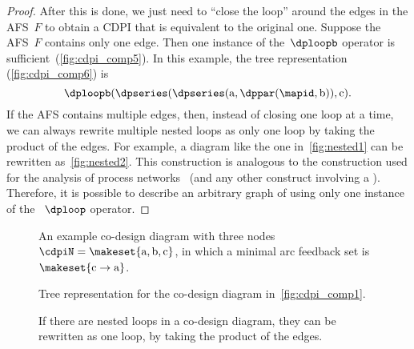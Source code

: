\begin{proof}
    After this is done, we just need to ``close the loop'' around the edges in the AFS~$F$ to obtain a CDPI that is equivalent to the original one.
    Suppose the AFS~$F$ contains only one edge.
    Then one instance of the~$\dploopb$ operator is sufficient~(\cref{fig:cdpi_comp5}).
    In this example, the tree representation (\cref{fig:cdpi_comp6}) is
    \begin{equation}
        \dploopb(\dpseries(\dpseries(\text{a},\dppar(\mapid,\text{b})),\text{c}).
    \end{equation}
    If the AFS contains multiple edges, then, instead of closing one loop at a time, we can always rewrite multiple nested loops as only one loop by taking the product of the edges.
    For example, a diagram like the one in~\cref{fig:nested1} can be rewritten as~\cref{fig:nested2}.
    This construction is analogous to the construction used for the analysis of process networks~\cite{lee10} (and any other construct involving a ).
    Therefore, it is possible to describe an arbitrary graph of  using only one instance of the ~$\dploop$ operator.
\end{proof}

\begin{figure}[tbh]
    \hfill{}
    \hfill{}

    \caption{An example co-design diagram with three nodes~$\cdpiN=\makeset{\text{a},\text{b},\text{c}}$,
        in which a minimal arc feedback set is $\makeset{\text{c}\rightarrow\text{a}}$.
    }
\end{figure}

\begin{figure}
    \hfill{}
    \hfill{}
    \hfill{}

    \caption{Tree representation for the co-design diagram in~\cref{fig:cdpi_comp1}.}
\end{figure}

\begin{figure}[h]
    \caption{If there are nested loops in a co-design diagram, they can be rewritten as one loop, by taking the product of the edges.}
    \label{fig:If-there-are}
\end{figure}
